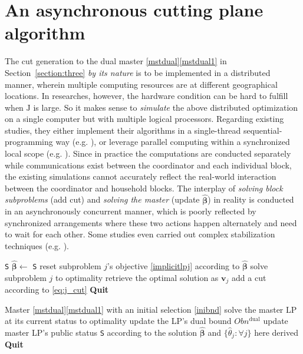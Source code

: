 \documentclass[journal]{IEEEtran}
\begin{document}
\section{An asynchronous cutting plane algorithm}\label{section:four}
The cut generation to the dual master \eqref{mstdual}\eqref{mstdual1} in Section~\ref{section:three}
\textit{by its nature} is to be implemented in a distributed
manner, wherein multiple computing resources are at different geographical locations.
In researches, however, the hardware condition can be hard
to fulfill when $\mathrm{J}$ is large.
So it makes sense to \textit{simulate} the above distributed optimization
on a single computer but with multiple logical processors.
Regarding existing studies, they either implement their algorithms
in a single-thread sequential-programming way (e.g. \cite{fast2016}\!\!\cite{orlm2016}\!\!\cite{dw2019}\!\!\cite{liu2024}), or leverage
parallel computing within a synchronized local scope (e.g. \cite{benders}).
Since in practice the computations are conducted separately while communications
exist between the coordinator and each individual block, the existing simulations
cannot accurately reflect the real-world interaction between the coordinator and
household blocks.
The interplay of \textit{solving block subproblems} (add cut) and \textit{solving the master} (update $\hat{\boldsymbol{\beta}}$) in reality
is conducted in an asynchronously concurrent manner, which is poorly reflected by
synchronized arrangements where these two actions happen alternately
and need to wait for each other.
Some studies even carried out complex stabilization techniques (e.g. \cite{fast2016}).
\begin{algorithm}
    \caption{Block-$j$-Subproblem's Procedure} \label{algo:block}
    \begin{algorithmic}[1]
    \Require \texttt{S} 
    \State $\hat{\boldsymbol{\beta}} \gets$ \texttt{S}  \label{line:snapbeta}
    \State reset subproblem $j$'s objective \eqref{implicitlpj} according to $\hat{\boldsymbol{\beta}}$
    \State solve subproblem $j$ to optimality  \label{linemilp}
    \State retrieve the optimal solution as $\mathbf{v}_j$ \label{line:solgene} 
    \State add a cut according to \eqref{eq:j_cut} 
    \State \textbf{Quit}
    \end{algorithmic}
\end{algorithm}
\begin{algorithm}
\caption{Coordinator master problem's Procedure} \label{algo:mst}
\begin{algorithmic}[1]
\Require Master \eqref{mstdual}\eqref{mstdual1} with an initial selection \eqref{inibnd}
\State solve the master LP at its current status to optimality
\State update the LP's dual bound $Obn^\textrm{dual}$ \label{line:dualLPbound}
\State update master LP's public status \texttt{S} according to the solution $\hat{\boldsymbol{\beta}}$ and $\{\hat{\theta}_j: \forall j\}$ here derived \label{line:updateS}
\State \textbf{Quit}
\end{algorithmic}
\end{algorithm}
\end{document}
